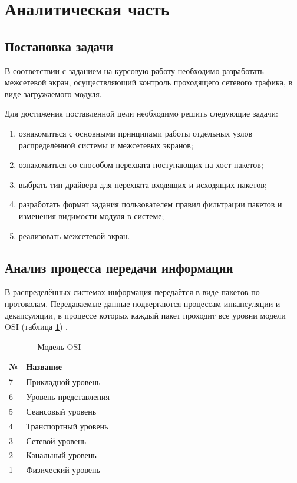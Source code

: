 \section{Аналитическая часть}

\subsection{Постановка задачи}\label{sec:task}
В соответствии с заданием на курсовую работу необходимо разработать межсетевой экран, осуществляющий контроль проходящего сетевого трафика, в виде загружаемого модуля.

Для достижения поставленной цели необходимо решить следующие задачи:
\begin{enumerate}
	\item ознакомиться с основными принципами работы отдельных узлов распределённой системы и межсетевых экранов;
	
	\item ознакомиться со способом перехвата поступающих на хост пакетов;
	
	\item выбрать тип драйвера для перехвата входящих и исходящих пакетов;
	
	\item разработать формат задания пользователем правил фильтрации пакетов и изменения видимости модуля в системе;
	
	\item реализовать межсетевой экран. \newline
\end{enumerate}

\subsection{Анализ процесса передачи информации}
В распределённых системах информация передаётся в виде пакетов по протоколам. Передаваемые данные подвергаются процессам инкапсуляции и декапсуляции, в процессе которых каждый пакет проходит все уровни модели OSI (таблица \ref{osi_table}) \cite{net}.

\begin{table}[h]
	\begin{center}
		\caption{Модель OSI}
		\label{osi_table}
		\begin{tabular}{| p{1cm} | p{7cm} |}
			\hline
			\textbf{№} 	& \textbf{Название} \\
			\hline
			7 		& Прикладной уровень\\ 
			\hline
			6 		& Уровень представления  \\ 
			\hline
			5 		& Сеансовый уровень \\ 
			\hline
			4 		& Транспортный уровень \\ 
			\hline
			3 		& Сетевой уровень \\ 
			\hline
			2 		& Канальный уровень \\ 
			\hline
			1 		& Физический уровень \\ 
			\hline
		\end{tabular}
	\end{center}
\end{table} 

